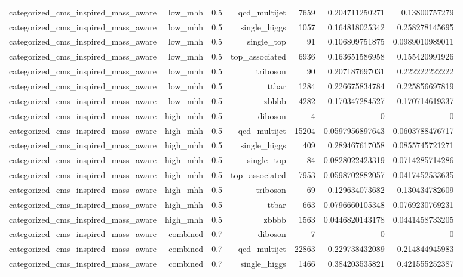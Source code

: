 \begin{table}[htbp]
{\begin{tabular}{lrrrrrr}
categorized\_cms\_inspired\_mass\_aware & low\_mhh & 0.5 & qcd\_multijet & 7659 & 0.204711250271 & 0.13800757279 \\
categorized\_cms\_inspired\_mass\_aware & low\_mhh & 0.5 & single\_higgs & 1057 & 0.164818025342 & 0.258278145695 \\
categorized\_cms\_inspired\_mass\_aware & low\_mhh & 0.5 & single\_top & 91 & 0.106809751875 & 0.0989010989011 \\
categorized\_cms\_inspired\_mass\_aware & low\_mhh & 0.5 & top\_associated & 6936 & 0.163651586958 & 0.155420991926 \\
categorized\_cms\_inspired\_mass\_aware & low\_mhh & 0.5 & triboson & 90 & 0.207187697031 & 0.222222222222 \\
categorized\_cms\_inspired\_mass\_aware & low\_mhh & 0.5 & ttbar & 1284 & 0.226675834784 & 0.225856697819 \\
categorized\_cms\_inspired\_mass\_aware & low\_mhh & 0.5 & zbbbb & 4282 & 0.170347284527 & 0.170714619337 \\
categorized\_cms\_inspired\_mass\_aware & high\_mhh & 0.5 & diboson & 4 & 0 & 0 \\
categorized\_cms\_inspired\_mass\_aware & high\_mhh & 0.5 & qcd\_multijet & 15204 & 0.0597956897643 & 0.0603788476717 \\
categorized\_cms\_inspired\_mass\_aware & high\_mhh & 0.5 & single\_higgs & 409 & 0.289467617058 & 0.0855745721271 \\
categorized\_cms\_inspired\_mass\_aware & high\_mhh & 0.5 & single\_top & 84 & 0.0828022423319 & 0.0714285714286 \\
categorized\_cms\_inspired\_mass\_aware & high\_mhh & 0.5 & top\_associated & 7953 & 0.0598702882057 & 0.0417452533635 \\
categorized\_cms\_inspired\_mass\_aware & high\_mhh & 0.5 & triboson & 69 & 0.129634073682 & 0.130434782609 \\
categorized\_cms\_inspired\_mass\_aware & high\_mhh & 0.5 & ttbar & 663 & 0.0796660105348 & 0.0769230769231 \\
categorized\_cms\_inspired\_mass\_aware & high\_mhh & 0.5 & zbbbb & 1563 & 0.0446820143178 & 0.0441458733205 \\
categorized\_cms\_inspired\_mass\_aware & combined & 0.7 & diboson & 7 & 0 & 0 \\
categorized\_cms\_inspired\_mass\_aware & combined & 0.7 & qcd\_multijet & 22863 & 0.229738432089 & 0.214844945983 \\
categorized\_cms\_inspired\_mass\_aware & combined & 0.7 & single\_higgs & 1466 & 0.384203535821 & 0.421555252387 \\

\end{tabular}}
\end{table}
